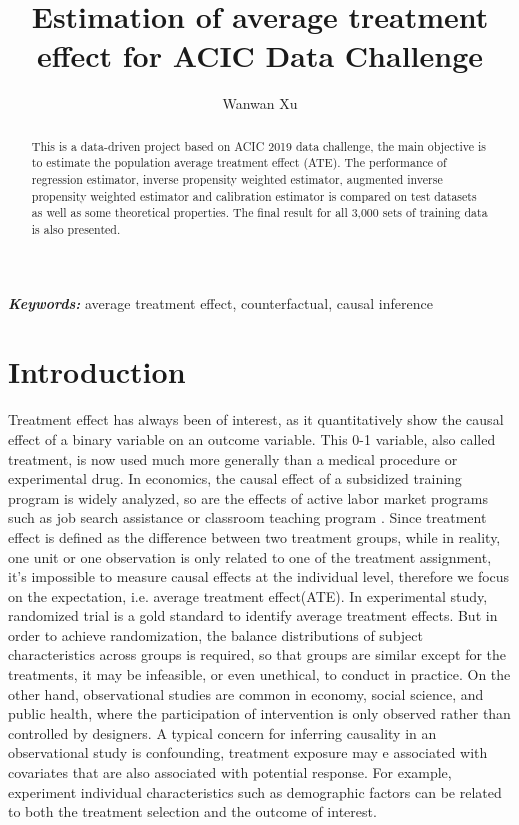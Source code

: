 \documentclass[12pt, oneside]{article}
\title{Estimation of average treatment effect for ACIC Data Challenge}
\author[]{Wanwan Xu}
\affil[]{Univeristy of Connecticut, Department of Statistics}
\date{}
\providecommand{\keywords}[1]
{
  \small	
  \textbf{\textit{Keywords:}} #1
}
\begin{document}
\maketitle

\begin{abstract}
This is a data-driven project based on ACIC 2019 data challenge, the main objective is to estimate the population average treatment effect (ATE). The performance of regression estimator, inverse propensity weighted estimator, augmented inverse propensity weighted estimator and calibration estimator is compared on test datasets as well as some theoretical properties. The final result for all 3,000 sets of training data is also presented. 
\end{abstract}
\keywords{average treatment effect, counterfactual, causal inference}

\section{Introduction}
Treatment effect has always been of interest, as it quantitatively  show the causal effect of a binary variable on an outcome variable. This 0-1 variable, also called treatment, is now used much more generally than a medical procedure or experimental drug. In economics, the causal effect of a subsidized training program \cite{Ashenfelter1978} is widely analyzed, so are the effects of active labor market programs such as job search assistance or classroom teaching program \cite{LaLonde1986}. Since treatment effect is defined as the difference between two treatment groups, while in reality, one unit or one observation is only related to one of the treatment assignment, it's impossible to measure causal effects at the individual level, therefore we focus on the expectation, i.e. average treatment effect(ATE). In experimental study, randomized trial is a gold standard to identify average treatment effects. But in order to achieve randomization, the balance distributions of subject characteristics across groups is required, so that groups are similar except for the treatments, it may be infeasible, or even unethical, to conduct in practice. On the other hand, observational studies are common in economy, social science, and public health, where the participation of intervention is only observed rather than controlled by designers. A typical concern for inferring causality in an observational study is confounding, treatment exposure may e associated with covariates that are also associated with potential response. For example, experiment individual characteristics such as demographic factors can be related to both the treatment selection and the outcome of interest. 
\end{document}
